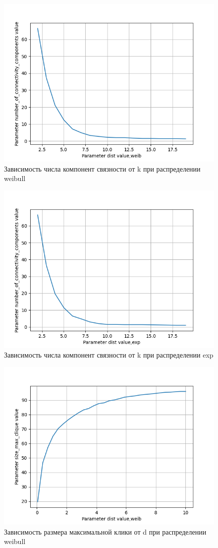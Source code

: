 \documentclass{HSEtitle}
\begin{document}
\begin{figure}[hb]
    \centering
    \includegraphics[width=0.65\linewidth]{weib_k.png}
    \caption{Зависимость числа компонент связности от k при распределении weibull}
    \label{fig:enter-label}
\end{figure}

\begin{figure}[h]
    \centering
    \includegraphics[width=0.65\linewidth]{exp_k.png}
    \caption{Зависимость числа компонент связности от k при распределении exp}
    \label{fig:enter-label}
\end{figure}

\begin{figure}[h]
    \centering
    \includegraphics[width=0.65\linewidth]{weib_d.png}
    \caption{Зависимость размера максимальной клики от d при распределении weibull}
    \label{fig:enter-label}
\end{figure}
\end{document}
